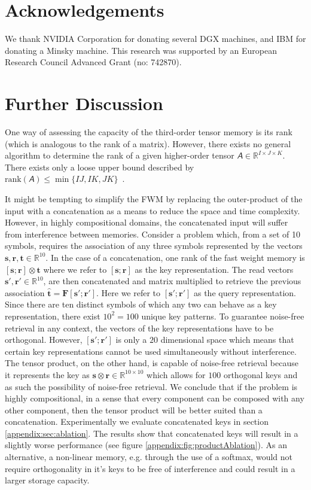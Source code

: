 \documentclass{article} \usepackage{iclr2021_conference,times}
\def\vr{{\bm{r}}}
\def\vs{{\bm{s}}}
\def\vt{{\bm{t}}}
\def\mF{{\bm{F}}}
\newcommand{\tens}[1]{\bm{\mathsfit{#1}}}
\def\tA{{\tens{A}}}
\newcommand\StartAppendixEntries{}
\newcommand*\appendixwithtoc{\cleardoublepage
  \appendix
  \addtocontents{toc}{\protect\StartAppendixEntries}
  \listofatoc
}
\begin{document}
\section*{Acknowledgements}
We thank NVIDIA Corporation for donating several DGX
machines, and IBM for donating a Minsky machine.
This research was supported by an European
Research Council Advanced Grant (no: 742870).





\appendixwithtoc
\newpage

\section{Further Discussion}
\label{appendix:sec:discussion}
One way of assessing the capacity of the third-order tensor memory is its rank (which is analogous to the rank of a matrix). 
However, there exists no general algorithm to determine the rank of a given higher-order tensor $\tA \in \mathbb{R}^{I \times J \times K}$. There exists only a loose upper bound described by $\text{rank}(\tA) \leq \min\{IJ,IK,JK\}$~\citep{kruskal1989rank,kolda2009tensor}.

It might be tempting to simplify the FWM by replacing the outer-product of the input with a concatenation as a means to reduce the space and time complexity. 
However, in highly compositional domains, the concatenated input will suffer from interference between memories.
Consider a problem which, from a set of 10 symbols, requires the association of any three symbols represented by the vectors $\vs, \vr, \vt \in \mathbb{R}^{10}$. 
In the case of a concatenation, one rank of the fast weight memory is $[\vs; \vr] \otimes \vt$ where we refer to $[\vs; \vr]$ as the key representation. 
The read vectors $\vs', \vr' \in \mathbb{R}^{10}$, are then concatenated and matrix multiplied to retrieve the previous association $\hat{\vt} = \mF [\vs'; \vr']$. 
Here we refer to $[\vs'; \vr']$ as the query representation. 
Since there are ten distinct symbols of which any two can behave as a key representation, there exist $10^2=100$ unique key patterns. 
To guarantee noise-free retrieval in any context, the vectors of the key representations have to be orthogonal. 
However, $[\vs'; \vr']$ is only a $20$ dimensional space which means that certain key representations cannot be used simultaneously without interference.
The tensor product, on the other hand, is capable of noise-free retrieval because it represents the key as $\vs \otimes \vr \in \mathbb{R}^{10 \times 10}$ which allows for $100$ orthogonal keys and as such the possibility of noise-free retrieval.
We conclude that if the problem is highly compositional, in a sense that every component can be composed with any other component, then the tensor product will be better suited than a concatenation. Experimentally we evaluate concatenated keys in section \ref{appendix:sec:ablation}. The results show that concatenated keys will result in a slightly worse performance (see figure \ref{appendix:fig:productAblation}). As an alternative, a non-linear memory, e.g. through the use of a softmax, would not require orthogonality in it's keys to be free of interference and could result in a larger storage capacity.
\end{document}
